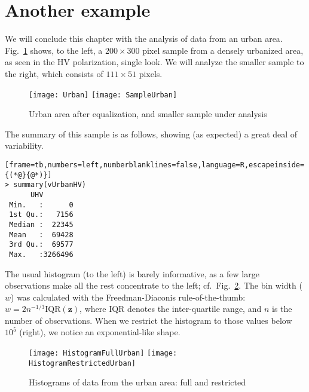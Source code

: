 \section{Another example}

We will conclude this chapter with the analysis of data from an urban area.
Fig.~\ref{Image:UrbanArea} shows, to the left, a $200\times 300$ pixel sample from a densely urbanized area, as seen in the HV polarization, single look.
We will analyze the smaller sample to the right, which consists of $111\times 51$ pixels.

\begin{figure}[hbt]
\centering
\texttt{[image: Urban]}\quad
\texttt{[image: SampleUrban]}
\caption{Urban area after equalization, and smaller sample under analysis}\label{Image:UrbanArea}
\end{figure}

The summary of this sample is as follows, showing (as expected) a great deal of variability.
\begin{lstlisting}[frame=tb,numbers=left,numberblanklines=false,language=R,escapeinside={(*@}{@*)}]
> summary(vUrbanHV)
      UHV         
 Min.   :      0  
 1st Qu.:   7156  
 Median :  22345  
 Mean   :  69428  
 3rd Qu.:  69577  
 Max.   :3266496  
\end{lstlisting}

The usual histogram (to the left) is barely informative, as a few large observations make all the rest concentrate to the left; cf.\ Fig.~\ref{Fig:HistogramsUrbanAreas}.
The bin width ($w$) was calculated with the Freedman-Diaconis rule-of-the-thumb: $w=2n^{-1/3}\text{IQR}(\bm z)$, where $\text{IQR}$ denotes the inter-quartile range, and $n$ is the number of observations\cite{OntheHistogramAsaDensityEstimatorL2Theory1981}.
When we restrict the histogram to those values below $10^5$ (right), we notice an exponential-like shape.

\begin{figure}[hbt]
\centering
\texttt{[image: HistogramFullUrban]}
\texttt{[image: HistogramRestrictedUrban]}
\caption{Histograms of data from the urban area: full and restricted}\label{Fig:HistogramsUrbanAreas}
\end{figure}

